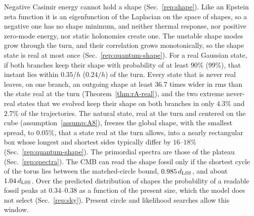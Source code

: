Negative Casimir energy cannot hold a shape (Sec.~\ref{rep:shape}).
Like an Epstein zeta function it is an eigenfunction of the Laplacian on the space of shapes, so a negative one has no shape minimum, and neither thermal response, nor positive zero-mode energy, nor static holonomies create one.
The unstable shape modes grow through the turn, and their correlation grows monotonically, so the shape state is real at most once (Sec.~\ref{rep:quantum-shape}).
For a real Gaussian state, if both branches keep their shape with probability of at least $90\%$ ($99\%$), that instant lies within $0.35/h$ ($0.24/h$) of the turn. %
Every state that is never real leaves, on one branch, an outgoing shape at least $36.7$ times wider in rms than the state real at the turn (Theorem~\ref{thm:rA-real}), and the two extreme never-real states that we evolved keep their shape on both branches in only $4.3\%$ and $2.7\%$ of the trajectories. %
The natural state, real at the turn and centered on the cube (assumption~\ref{assump:A8}), freezes the global shape, with the smallest spread, to $0.05\%$, that a state real at the turn allows, into a nearly rectangular box whose longest and shortest sides typically differ by $16$--$18\%$ (Sec.~\ref{rep:quantum-shape}). %
The primordial spectra are those of the plateau (Sec.~\ref{rep:spectra}).
The CMB can read the shape fossil only if the shortest cycle of the torus lies between the matched-circle bound, $0.985\,d_{\mathrm{LSS}}$, and about $1.04\,d_{\mathrm{LSS}}$. %
Over the predicted distribution of shapes the probability of a readable fossil peaks at $0.34$--$0.38$ as a function of the present size, which the model does not select (Sec.~\ref{rep:sky}). %
Present circle and likelihood searches allow this window.

